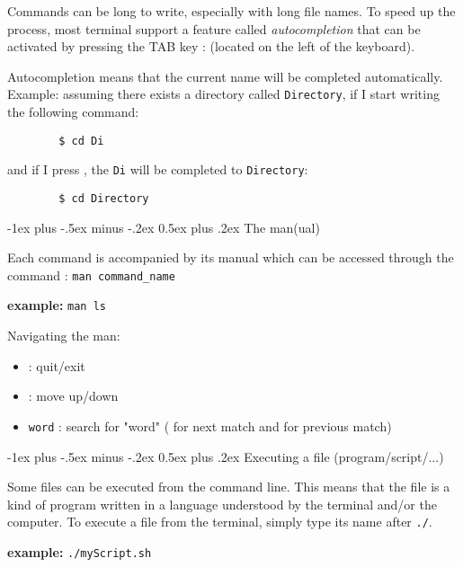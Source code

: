 \documentclass[10pt,landscape]{article}
\makeatletter
\renewcommand{\section}{\@startsection{section}{1}{0mm}%
	{-1ex plus -.5ex minus -.2ex}%
	{0.5ex plus .2ex}%
	{\normalfont\large\bfseries}}
\makeatother
\begin{document}
\begin{multicols}{2}
		Commands can be long to write, especially with long file names. To speed up the process, most terminal support a feature called \emph{autocompletion} that can be activated by pressing the TAB key : \keys{\tab} (located on the left of the keyboard).
		
		Autocompletion means that the current name will be completed automatically.
		Example: assuming there exists a directory called \texttt{Directory}, if I start writing the following command:
		
		\begin{verbatim}
		$ cd Di
		\end{verbatim}
		
		and if I press \keys{\tab}, the \texttt{Di} will be completed to \texttt{Directory}: 
		
		\begin{verbatim}
		$ cd Directory
		\end{verbatim}
		\section{The man(ual)}
		
		Each command is accompanied by its manual which can be accessed through the command : \texttt{man command\_name}
		
		\textbf{example:} \texttt{man ls} 
		
		Navigating the man:
		\begin{itemize}
			\item {}: quit/exit
			\item \keys{\arrowkeyup} \keys{\arrowkeydown}: move up/down
			\item \keys{/} \texttt{word} \keys{\enter}: search for "word" ( for next match and  for previous match)
		\end{itemize} 
	    \section{Executing a file (program/script/...)}
	    
	    Some files can be executed from the command line. This means that the file is a kind of program written in a language understood by the terminal and/or the computer. To execute a file from the terminal, simply type its name after \texttt{./}.
	    
	    		\textbf{example:} \texttt{./myScript.sh} 
	    
	
	

\end{multicols}
\end{document}
